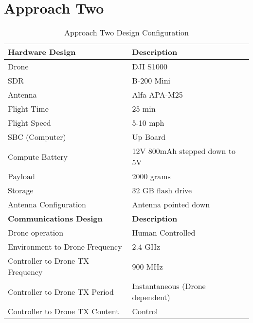 \section{Approach Two}
\begin{table}[ht]
\centering
\caption{Approach Two Design Configuration}
\label{table:approach_two}
\begin{tabular}{|l|l|}
    \hline  \textbf{Hardware Design}              & \textbf{Description}                      \\ \hline
            Drone                                 & DJI S1000                                 \\
            SDR                                   & B-200 Mini                                \\
            Antenna                               & Alfa APA-M25                              \\
            Flight Time                           & 25 min                                    \\
            Flight Speed                          & 5-10 mph                                  \\
            SBC (Computer)                        & Up Board                                  \\
            Compute Battery                       & 12V 800mAh stepped down to 5V             \\
            Payload                               & 2000 grams                                \\
            Storage                               & 32 GB flash drive                         \\
            Antenna Configuration                 & Antenna pointed down                      \\
    \hline  \textbf{Communications Design}        & \textbf{Description}                      \\ \hline
            Drone operation                       & Human Controlled                          \\
            Environment to Drone Frequency        & 2.4 GHz                                   \\
            Controller to Drone TX Frequency      & 900 MHz                                   \\
            Controller to Drone TX Period         & Instantaneous (Drone dependent)           \\
            Controller to Drone TX Content        & Control                                   \\

\end{tabular}
\end{table}
